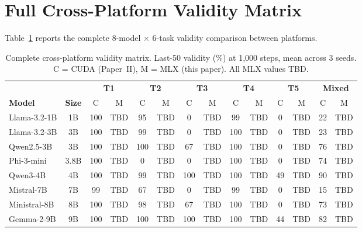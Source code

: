 \documentclass[11pt]{article}
\begin{document}




\appendix

\section{Full Cross-Platform Validity Matrix}
\label{app:full-matrix}

Table~\ref{tab:full-matrix} reports the complete 8-model $\times$ 6-task validity comparison between platforms.

\begin{table}[h]
\centering
\caption{Complete cross-platform validity matrix.  Last-50 validity (\%) at 1{,}000 steps, mean across 3 seeds.  C = CUDA (Paper~II), M = MLX (this paper).  All MLX values TBD.}
\label{tab:full-matrix}
\footnotesize
\begin{tabular}{lc cc cc cc cc cc cc}
\toprule
& & \multicolumn{2}{c}{\textbf{T1}} & \multicolumn{2}{c}{\textbf{T2}} & \multicolumn{2}{c}{\textbf{T3}} & \multicolumn{2}{c}{\textbf{T4}} & \multicolumn{2}{c}{\textbf{T5}} & \multicolumn{2}{c}{\textbf{Mixed}} \\
\cmidrule(lr){3-4} \cmidrule(lr){5-6} \cmidrule(lr){7-8} \cmidrule(lr){9-10} \cmidrule(lr){11-12} \cmidrule(lr){13-14}
\textbf{Model} & \textbf{Size} & C & M & C & M & C & M & C & M & C & M & C & M \\
\midrule
Llama-3.2-1B & 1B & 100 & \tiny{TBD} & 95 & \tiny{TBD} & 0 & \tiny{TBD} & 99 & \tiny{TBD} & 0 & \tiny{TBD} & 22 & \tiny{TBD} \\
Llama-3.2-3B & 3B & 100 & \tiny{TBD} & 99 & \tiny{TBD} & 0 & \tiny{TBD} & 100 & \tiny{TBD} & 0 & \tiny{TBD} & 23 & \tiny{TBD} \\
Qwen2.5-3B & 3B & 100 & \tiny{TBD} & 100 & \tiny{TBD} & 67 & \tiny{TBD} & 100 & \tiny{TBD} & 0 & \tiny{TBD} & 76 & \tiny{TBD} \\
Phi-3-mini & 3.8B & 100 & \tiny{TBD} & 0 & \tiny{TBD} & 0 & \tiny{TBD} & 100 & \tiny{TBD} & 0 & \tiny{TBD} & 74 & \tiny{TBD} \\
Qwen3-4B & 4B & 100 & \tiny{TBD} & 99 & \tiny{TBD} & 100 & \tiny{TBD} & 100 & \tiny{TBD} & 49 & \tiny{TBD} & 90 & \tiny{TBD} \\
Mistral-7B & 7B & 99 & \tiny{TBD} & 67 & \tiny{TBD} & 0 & \tiny{TBD} & 99 & \tiny{TBD} & 0 & \tiny{TBD} & 15 & \tiny{TBD} \\
Ministral-8B & 8B & 100 & \tiny{TBD} & 98 & \tiny{TBD} & 67 & \tiny{TBD} & 100 & \tiny{TBD} & 0 & \tiny{TBD} & 73 & \tiny{TBD} \\
Gemma-2-9B & 9B & 100 & \tiny{TBD} & 100 & \tiny{TBD} & 100 & \tiny{TBD} & 100 & \tiny{TBD} & 44 & \tiny{TBD} & 82 & \tiny{TBD} \\
\bottomrule
\end{tabular}
\end{table}
\end{document}

